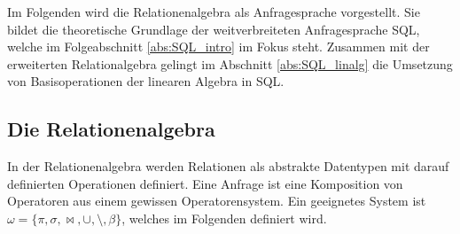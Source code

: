Im Folgenden wird die Relationenalgebra als Anfragesprache vorgestellt. Sie bildet die theoretische Grundlage der weitverbreiteten Anfragesprache SQL, welche im Folgeabschnitt \ref{abs:SQL_intro} im Fokus steht. Zusammen mit der erweiterten Relationalgebra gelingt im Abschnitt \ref{abs:SQL_linalg} die Umsetzung von Basisoperationen der linearen Algebra in SQL.

\subsection{Die Relationenalgebra}
\label{abs:rela_algebra}
In der Relationenalgebra werden Relationen als abstrakte Datentypen mit darauf definierten Operationen definiert. Eine Anfrage ist eine Komposition von Operatoren aus einem gewissen Operatorensystem. Ein geeignetes System ist $\omega= \{ \pi, \sigma, \bowtie, \cup, \setminus, \beta \}$, welches im Folgenden definiert wird.

